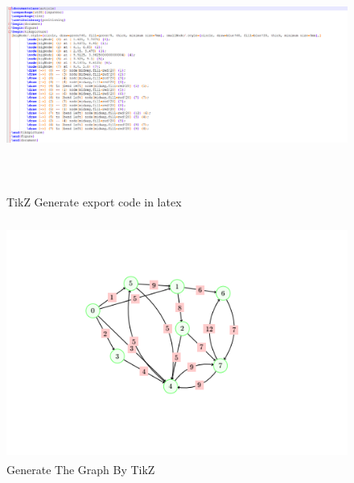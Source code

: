 \documentclass[a4paper,10pt]{article}
\begin{document}
\paragraph{}
\begin{figure}[H]
		\centering
		\includegraphics[height = 3in]{tikz_code_export.png}
		\caption[Optional caption]{TikZ Generate export code in latex}
		\label{fig:Repository}
	\end{figure}
\paragraph{}
\begin{figure}[H]
		\centering
		\includegraphics[height = 3in]{tikz_graph_image.png}
		\caption[Optional caption]{Generate The Graph By TikZ}
		\label{fig:Repository}
	\end{figure}
\paragraph{}
\newpage
{}
\printbibliography
\end{document}
